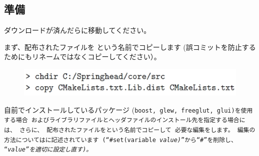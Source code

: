 \subsection{準備}
\label{subsec:PrepareLibrary}

\noindent
ダウンロードが済んだらに移動してください。

\noindent
まず、配布されたファイルを
\CMakeLists{}という名前でコピーします
(誤コミットを防止するためにもリネームではなくコピーしてください）。

\medskip
\ifLwarp
	\begin{figure}[h]
	    \begin{center}
	    \includegraphics[width=\textwidth]{fig/command-2-2-a.eps}
	    \end{center}
	    \label{fig:DownloadTree}
	\end{figure}
\else
\begin{narrow}[15pt]
\end{narrow}
\fi

\medskip
\noindent
自前でインストールしているパッケージ
(\tt{boost}, \tt{glew}, \tt{freeglut}, \tt{glui})を使用する場合
およびライブラリファイルとヘッダファイルのインストール先を指定する場合には、
さらに、
配布されたファイルを\CMakeConf{}という名前でコピーして
必要な編集をします。
編集の方法については\CMakeConf{}に記述されています
(``\tt{\#set(variable \it{value})}''から``\tt{\#}''を削除し、
``\it{value}''を適切に設定し直す)。

